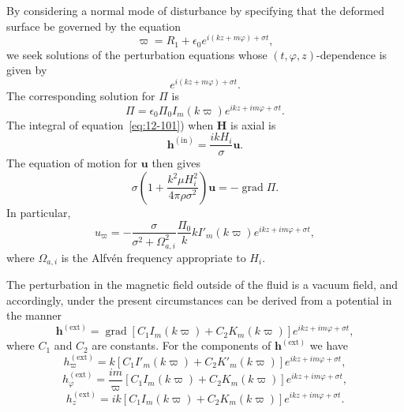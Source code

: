 By considering a normal mode of disturbance by specifying that the deformed surface be governed by the equation
\begin{equation}
\label{eq:12-334}
\varpi = R_1 + \epsilon_0 e^{i(kz+m\varphi)+\sigma t},
\end{equation}
we seek solutions of the perturbation equations whose $(t,\varphi,z)$-dependence is given by
\begin{equation}
\label{eq:12-335}
e^{i(kz+m\varphi)+\sigma t}.
\end{equation}
The corresponding solution for $\Pi$ is
\begin{equation}
\label{eq:12-336}
\Pi = \epsilon_0\Pi_0 I_m(k\varpi)e^{ikz+im\varphi+\sigma t}.
\end{equation}
The integral of equation~\eqref{eq:12-101}) when $\mathbf{H}$ is axial is
\begin{equation}
\label{eq:12-337}
\mathbf{h}^{(\mathrm{in})} = \frac{ikH_i}{\sigma}\mathbf{u}.
\end{equation}
The equation of motion for $\mathbf{u}$ then gives
\begin{equation}
\label{eq:12-338}
\sigma\left(1 + \frac{k^2\mu H_i^2}{4\pi\rho\sigma^2}\right)\mathbf{u} = -\operatorname{grad}\Pi.
\end{equation}
In particular,
\begin{equation}
\label{eq:12-339}
u_\varpi = -\frac{\sigma}{\sigma^2+\Omega_{a,i}^2}\frac{\Pi_0}{k}kI'_m(k\varpi)e^{ikz+im\varphi+\sigma t},
\end{equation}
where $\Omega_{a,i}$ is the Alfv\'en frequency appropriate to $H_i$.

The perturbation in the magnetic field outside of the fluid is a vacuum field, and accordingly, under the present circumstances can be derived from a potential in the manner
\begin{equation}
\label{eq:12-340}
\mathbf{h}^{(\mathrm{ext})} = \operatorname{grad}[C_1 I_m(k\varpi) + C_2 K_m(k\varpi)]e^{ikz+im\varphi+\sigma t},
\end{equation}
where $C_1$ and $C_2$ are constants. For the components of $\mathbf{h}^{(\mathrm{ext})}$ we have
\begin{equation}
\label{eq:12-341}
h_\varpi^{(\mathrm{ext})} = k[C_1 I'_m(k\varpi) + C_2 K'_m(k\varpi)]e^{ikz+im\varphi+\sigma t},
\end{equation}
\begin{equation}
\label{eq:12-342}
h_\varphi^{(\mathrm{ext})} = \frac{im}{\varpi}[C_1 I_m(k\varpi) + C_2 K_m(k\varpi)]e^{ikz+im\varphi+\sigma t},
\end{equation}
\begin{equation}
\label{eq:12-343}
h_z^{(\mathrm{ext})} = ik[C_1 I_m(k\varpi) + C_2 K_m(k\varpi)]e^{ikz+im\varphi+\sigma t}.
\end{equation}

